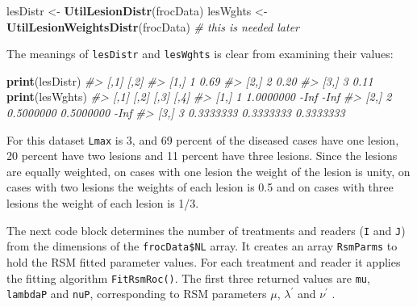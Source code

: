 \documentclass[]{book}
\newenvironment{Shaded}{\begin{snugshade}}{\end{snugshade}}
\newcommand{\CommentTok}[1]{\textcolor[rgb]{0.56,0.35,0.01}{\textit{#1}}}
\newcommand{\KeywordTok}[1]{\textcolor[rgb]{0.13,0.29,0.53}{\textbf{#1}}}
\newcommand{\NormalTok}[1]{#1}
\newcommand{\StringTok}[1]{\textcolor[rgb]{0.31,0.60,0.02}{#1}}
\begin{document}
\begin{Shaded}
\begin{Highlighting}[]
\NormalTok{lesDistr <-}\StringTok{ }\KeywordTok{UtilLesionDistr}\NormalTok{(frocData)}
\NormalTok{lesWghts <-}\StringTok{ }\KeywordTok{UtilLesionWeightsDistr}\NormalTok{(frocData) }\CommentTok{# this is needed later}
\end{Highlighting}
\end{Shaded}

The meanings of \texttt{lesDistr} and \texttt{lesWghts} is clear from examining their values:

\begin{Shaded}
\begin{Highlighting}[]
\KeywordTok{print}\NormalTok{(lesDistr)}
\CommentTok{#>      [,1] [,2]}
\CommentTok{#> [1,]    1 0.69}
\CommentTok{#> [2,]    2 0.20}
\CommentTok{#> [3,]    3 0.11}
\KeywordTok{print}\NormalTok{(lesWghts)}
\CommentTok{#>      [,1]      [,2]      [,3]      [,4]}
\CommentTok{#> [1,]    1 1.0000000      -Inf      -Inf}
\CommentTok{#> [2,]    2 0.5000000 0.5000000      -Inf}
\CommentTok{#> [3,]    3 0.3333333 0.3333333 0.3333333}
\end{Highlighting}
\end{Shaded}

For this dataset \texttt{Lmax} is 3, and 69 percent of the diseased cases have one lesion, 20 percent have two lesions and 11 percent have three lesions. Since the lesions are equally weighted, on cases with one lesion the weight of the lesion is unity, on cases with two lesions the weights of each lesion is 0.5 and on cases with three lesions the weight of each lesion is 1/3.

The next code block determines the number of treatments and readers (\texttt{I} and \texttt{J}) from the dimensions of the \texttt{frocData\$NL} array. It creates an array \texttt{RsmParms} to hold the RSM fitted parameter values. For each treatment and reader it applies the fitting algorithm \texttt{FitRsmRoc()}. The first three returned values are \texttt{mu}, \texttt{lambdaP} and \texttt{nuP}, corresponding to RSM parameters \({\mu}\), \({\lambda^{'}}\) and \({\nu^{'}}\) .
\end{document}

